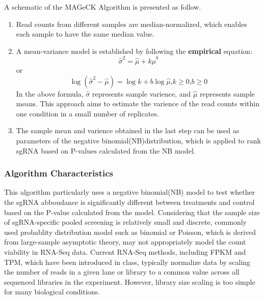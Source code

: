 \documentclass[fleqn,10pt]{wlscirep}
\begin{document}
A schematic of the MAGeCK Algorithm is presented as follow\cite{li2014mageck}.
\begin{enumerate}
    \item Read counts from different samples are median-normalized, which enables each sample to have the same median value.
    \item A mean-variance model is established by following the \textbf{empirical} equation:
        \begin{equation}
           \hat{\sigma}^2=\hat{\mu}+k\hat{\mu}^b
        \end{equation}
        or
        \begin{equation}
            \log{(\hat{\sigma}^2-\hat{\mu})}=\log{k}+b\log{\hat{\mu}}\textrm{,} k\geqslant{0} \textrm{,}b\geqslant{0}
         \end{equation}
        In the above formula, $\hat{\sigma}$ represents sample varience, and $\hat{\mu}$ represents sample means.  This approach aims to estimate the varience of the read counts within one condition in a small number of replicates.
    \item The sample mean and varience obtained in the last step can be used as parameters of the negative binomial(NB)distribution, which is applied to rank sgRNA based on P-values calculated from the NB model.
    \end{enumerate}

\subsubsection*{Algorithm Characteristics}

This algorithm particularly uses a negative binomial(NB) model to test whether the sgRNA abboudance is significantly different between treatments and control based on the P-value calculated from the model\cite{li2014mageck}.  Considering that the sample size of sgRNA-specific pooled screening is relatively small and discrete, commonly used probablity distribution model such as binomial or Poisson, which is derived from large-sample asymptotic theory, may not appropriately model the count viability in RNA-Seq data.\cite{di2011nbp} Current RNA-Seq methods, including FPKM and TPM, which have been introduced in class, typically normalize data by scaling the number of reads in a given lane or library to a common value across all sequenced libraries in the experiment.  However, library size scaling is too simple for many biological conditions\cite{robinson2010scaling}.
\end{document}
